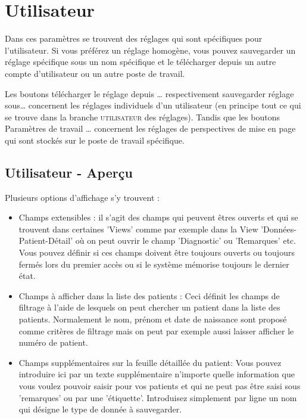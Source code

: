 \section{Utilisateur}
Dans ces paramètres se trouvent des réglages qui sont spécifiques pour l'utilisateur. Si vous préférez un réglage homogène, vous pouvez sauvegarder un réglage spécifique sous un nom spécifique et le télécharger depuis un autre compte d'utilisateur ou un autre poste de travail.

Les boutons  \glqq télécharger le réglage depuis \ldots\grqq{} respectivement \glqq sauvegarder réglage sous\ldots\grqq{} concernent les réglages individuels d'un utilisateur (en principe tout ce qui se trouve dans la branche \textsc{utilisateur} des réglages). Tandis que les boutons \glqq Paramètres de travail  \ldots\grqq{} concernent les réglages de perspectives de mise en page qui sont stockés sur le poste de travail spécifique.

\subsection{Utilisateur - Aperçu}
\label{userconfig}
Plusieurs options d'affichage s'y trouvent :
\begin{itemize}
\item Champs extensibles : il s'agit des champs qui peuvent êtres ouverts et qui se trouvent dans certaines 'Views' comme par exemple dans la View 'Données-Patient-Détail' où on peut ouvrir le champ 'Diagnostic' ou 'Remarques' etc. Vous pouvez définir si ces champs doivent être toujours ouverts ou toujours fermés lors du premier accès ou si le système mémorise toujours le dernier état.
\item Champs à afficher dans la liste des patients : Ceci définit les champs de filtrage à l'aide de lesquels on peut chercher un patient dans la liste des patients. Normalement le nom, prénom et date de naissance sont proposé comme critères de filtrage mais on peut par exemple aussi laisser afficher le numéro de patient.

\item Champs supplémentaires sur la feuille détaillée du patient: Vous pouvez introduire ici par un texte supplémentaire n'importe quelle information que vous voulez pouvoir saisir pour vos patients et qui ne peut pas être saisi sous 'remarques' ou par une 'étiquette'. Introduisez simplement par ligne un nom qui désigne le type de donnée à sauvegarder.

\end{itemize}

